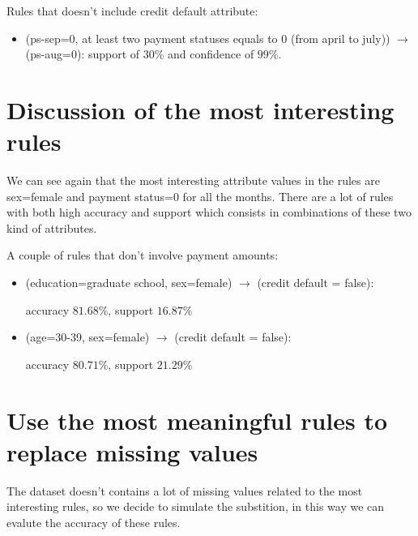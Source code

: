 Rules that doesn't include credit default attribute:

\begin{itemize}
  \item (ps-sep=0, at least two payment statuses equals to 0 (from april to july)) $\rightarrow$ (ps-aug=0):
  \tab support of $30\%$ and confidence of $99\%$.
\end{itemize}

\section{Discussion of the most interesting rules}

We can see again that the most interesting attribute values in the rules are sex=female and payment status=0 for all the months. There are a lot of rules with both high accuracy and support which consists in combinations of these two kind of attributes. 

\smallskip

A couple of rules that don't involve payment amounts:

\begin{itemize}
  \item (education=graduate school, sex=female) $\rightarrow$ (credit default = false):
  
    \tab accuracy $81.68\%$, support $16.87\%$
  \item (age=30-39, sex=female) $\rightarrow$ (credit default = false):
  
    \tab accuracy $80.71\%$, support $21.29\%$
\end{itemize}

\section{Use the most meaningful rules to replace missing values}

The dataset doesn't contains a lot of missing values related to the most interesting rules, so we decide to simulate the substition, in this way we can evalute the accuracy of these rules.

